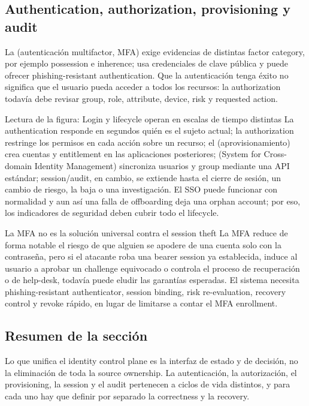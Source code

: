 \subsection{Authentication, authorization, provisioning y audit}

La  (autenticación multifactor, MFA) exige evidencias de distintas factor category, por ejemplo possession e inherence;  usa credenciales de clave pública y puede ofrecer phishing-resistant authentication. Que la autenticación tenga éxito no significa que el usuario pueda acceder a todos los recursos: la authorization todavía debe revisar group, role, attribute, device, risk y requested action.


\begin{knowledgebox}{Lectura de la figura: Login y lifecycle operan en escalas de tiempo distintas}
La authentication responde en segundos quién es el sujeto actual; la authorization restringe los permisos en cada acción sobre un recurso; el  (aprovisionamiento) crea cuentas y entitlement en las aplicaciones posteriores;  (System for Cross-domain Identity Management) sincroniza usuarios y group mediante una API estándar; session/audit, en cambio, se extiende hasta el cierre de sesión, un cambio de riesgo, la baja o una investigación. El SSO puede funcionar con normalidad y aun así una falla de offboarding deja una orphan account; por eso, los indicadores de seguridad deben cubrir todo el lifecycle.
\end{knowledgebox}

\begin{warningbox}{La MFA no es la solución universal contra el session theft}
La MFA reduce de forma notable el riesgo de que alguien se apodere de una cuenta solo con la contraseña, pero si el atacante roba una bearer session ya establecida, induce al usuario a aprobar un challenge equivocado o controla el proceso de recuperación o de help-desk, todavía puede eludir las garantías esperadas. El sistema necesita phishing-resistant authenticator, session binding, risk re-evaluation, recovery control y revoke rápido, en lugar de limitarse a contar el MFA enrollment.
\end{warningbox}

\subsection{Resumen de la sección}

Lo que unifica el identity control plane es la interfaz de estado y de decisión, no la eliminación de toda la source ownership. La autenticación, la autorización, el provisioning, la session y el audit pertenecen a ciclos de vida distintos, y para cada uno hay que definir por separado la correctness y la recovery.
